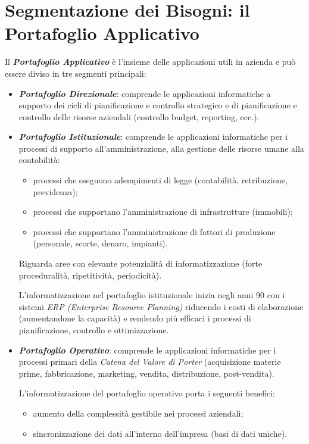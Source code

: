 \documentclass[a4paper, notitlepage, 9pt]{extreport}
\begin{document}
\section*{Segmentazione dei Bisogni: il Portafoglio Applicativo}
Il \textit{\textbf{Portafoglio Applicativo}} è l'insieme delle applicazioni utili in azienda e può essere diviso in tre segmenti principali:
\begin{itemize}
	\item \textit{\textbf{Portafoglio Direzionale}}: comprende le applicazioni informatiche a supporto dei cicli di pianificazione e controllo strategico e di pianificazione e controllo delle risorse aziendali (controllo budget, reporting, ecc.).
	
	\item \textit{\textbf{Portafoglio Istituzionale}}: comprende le applicazioni informatiche per i processi di supporto all’amministrazione, alla gestione delle risorse umane alla contabilità:
	\begin{itemize}
		\item processi che eseguono adempimenti di legge (contabilità, retribuzione, previdenza);
		\item processi che supportano l'amministrazione di infrastrutture (immobili);
		\item processi che supportano l’amministrazione di fattori di produzione (personale, scorte, denaro, impianti).
	\end{itemize}
	Riguarda aree con elevante potenzialità di informatizzazione (forte proceduralità, ripetitività, periodicità).
	
	L'informatizzazione nel portafoglio istituzionale inizia negli anni 90 con i sistemi \textit{ERP (Enterprise Resource Planning)} riducendo i costi di elaborazione (aumentandone la capacità) e rendendo più efficaci i processi di pianificazione, controllo e ottimizzazione.
	
	\item \textit{\textbf{Portafoglio Operativo}}: comprende le applicazioni informatiche per i processi primari della \textit{Catena del Valore di Porter} (acquisizione materie prime, fabbricazione, marketing, vendita, distribuzione, post-vendita).
	
	L'informatizzazione del portafoglio operativo porta i seguenti benefici:
	\begin{itemize}
		\item aumento della complessità gestibile nei processi aziendali;
		\item sincronizzazione dei dati all’interno dell’impresa (basi di dati uniche).
	\end{itemize}
\end{itemize}
\end{document}
